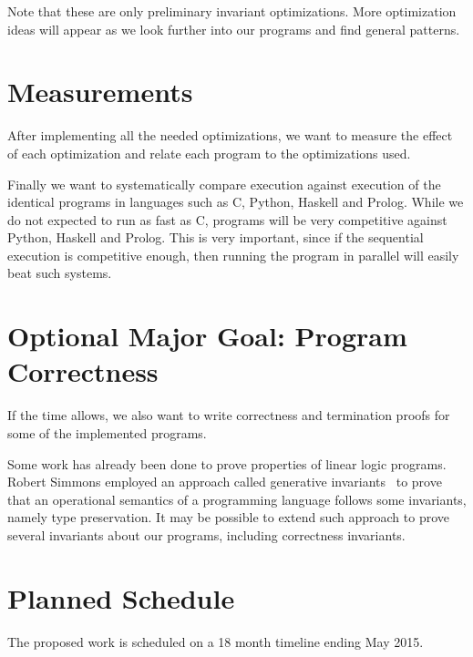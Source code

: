Note that these are only preliminary invariant optimizations. More optimization ideas will appear
as we look further into our programs and find general patterns.

\section{Measurements}

After implementing all the needed optimizations, we want to measure the effect of each optimization
and relate each program to the optimizations used.

Finally we want to systematically compare \lang execution against execution of the identical programs
in languages such as C, Python, Haskell and Prolog. While we do not expected to run as fast as C,
\lang programs will be very competitive against Python, Haskell and Prolog. This is very important, since
if the sequential execution is competitive enough, then running the program in parallel will
easily beat such systems.

\section{Optional Major Goal: Program Correctness}

If the time allows, we also want to write correctness and termination proofs for some of the implemented \lang programs.

Some work has already been done to prove properties of linear logic programs.
Robert Simmons employed an approach called generative invariants~\cite{simmons:Thesis} to prove that an operational semantics of a programming
language follows some invariants, namely type preservation. It may be possible to extend such approach to
prove several invariants about our programs, including correctness invariants.

\section{Planned Schedule}

The proposed work is scheduled on a 18 month timeline ending May 2015.

